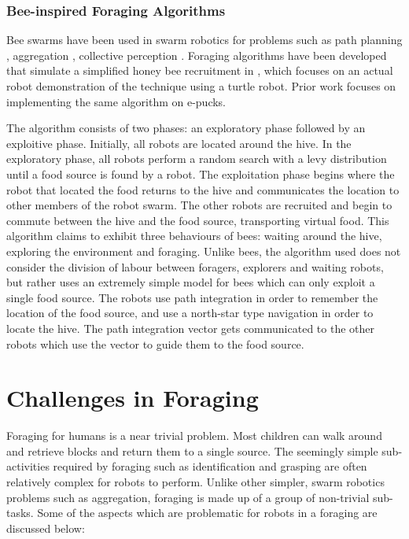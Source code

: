 \subsubsection{Bee-inspired Foraging Algorithms}
Bee swarms have been used in swarm robotics for problems such as path planning \cite{lin2009chaotic}, aggregation \cite{kernbach2009re}, collective perception \cite{schmickl2007collective}. Foraging algorithms have been developed that simulate a simplified honey bee recruitment in \cite{alers2014biologically}, which focuses on an actual robot demonstration of the technique using a turtle robot. Prior work focuses on implementing the same algorithm on e-pucks. 

The algorithm consists of two phases: an exploratory phase followed by an exploitive phase. Initially, all robots are located around the hive. In the exploratory phase, all robots perform a random search with a levy distribution until a food source is found by a robot. The exploitation phase begins where the robot that located the food returns to the hive and communicates the location to other members of the robot swarm. The other robots are recruited and begin to commute between the hive and the food source, transporting virtual food. This algorithm claims to exhibit three behaviours of bees: waiting around the hive, exploring the environment and foraging. Unlike bees, the algorithm used does not consider the division of labour between foragers, explorers and waiting robots, but rather uses an extremely simple model for bees which can only exploit a single food source. The robots use path integration in order to remember the location of the food source, and use a north-star type navigation in order to locate the hive. The path integration vector gets communicated to the other robots which use the vector to guide them to the food source. 




\section{Challenges in Foraging}
\label{challengesinforaging}

Foraging for humans is a near trivial problem. Most children can walk around and retrieve blocks and return them to a single source. The seemingly simple sub-activities required by foraging such as identification and grasping are often relatively complex for robots to perform. Unlike other simpler, swarm robotics problems such as aggregation, foraging is made up of a group of non-trivial sub-tasks. Some of the aspects which are problematic for robots in a foraging are discussed below:

